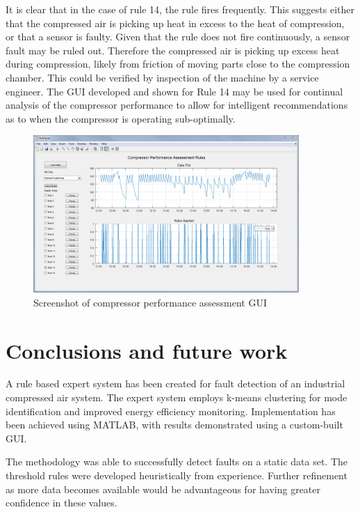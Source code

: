It is clear that in the case of rule 14, the rule fires frequently. This suggests either that the compressed air is picking up heat in excess to the heat of compression, or that a sensor is faulty. Given that the rule does not fire continuously, a sensor fault may be ruled out. Therefore the compressed air is picking up excess heat during compression, likely from friction of moving parts close to the compression chamber. This could be verified by inspection of the machine by a service engineer. The GUI developed and shown for Rule 14 may be used for continual analysis of the compressor performance to allow for intelligent recommendations as to when the compressor is operating sub-optimally.

\begin{figure}
\includegraphics[width = 0.9\textwidth]{./Images/RuleTester.png}
\caption{Screenshot of compressor performance assessment GUI}
\label{fig:ruletester}
\end{figure}


\section{Conclusions and future work}
\label{sec:conclusions}
A rule based expert system has been created for fault detection of an industrial compressed air system. The expert system employs k-means clustering for mode identification and improved energy efficiency monitoring. Implementation has been achieved using MATLAB, with results demonstrated using a custom-built GUI.

The methodology was able to successfully detect faults on a static data set. The threshold rules were developed heuristically from experience. Further refinement as more data becomes available would be advantageous for having greater confidence in these values.

